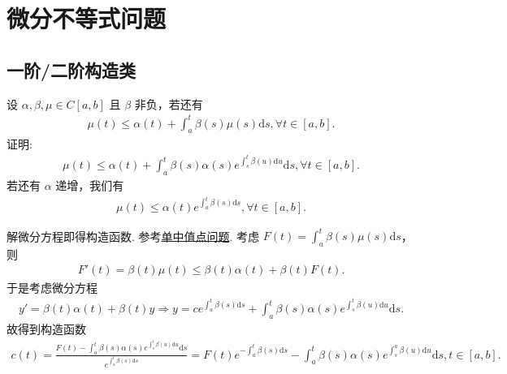 \documentclass[../../main.tex]{subfiles}%
\begin{document}
\section{微分不等式问题}

\subsection{一阶/二阶构造类}

\begin{proposition}[Gronwall不等式]\label{proposition:Gronwall不等式}
设 $\alpha,\beta,\mu\in C[a,b]$ 且 $\beta$ 非负，若还有
\begin{align}
\mu(t)\leqslant\alpha(t)+\int_{a}^{t}\beta(s)\mu(s)\mathrm{d}s,\forall t\in[a,b].
\label{equation---12.6}
\end{align}
证明:
\begin{align*}
\mu(t)\leqslant\alpha(t)+\int_{a}^{t}\beta(s)\alpha(s)e^{\int_{s}^{t}\beta(u)\mathrm{d}u}\mathrm{d}s,\forall t\in[a,b].
\end{align*}
若还有 $\alpha$ 递增，我们有
\begin{align*}
\mu(t)\leqslant\alpha(t)e^{\int_{a}^{t}\beta(s)\mathrm{d}s},\forall t\in[a,b].
\end{align*}
\end{proposition}
\begin{note}
解微分方程即得构造函数. 参考\hyperref[section单中值点问题]{单中值点问题}. 考虑 $F(t)=\int_{a}^{t}\beta(s)\mu(s)\mathrm{d}s$，则
\begin{align*}
F'(t)=\beta(t)\mu(t)\leqslant\beta(t)\alpha(t)+\beta(t)F(t).
\end{align*}
于是考虑微分方程
\begin{align*}
y'=\beta(t)\alpha(t)+\beta(t)y\Rightarrow y=ce^{\int_{a}^{t}\beta(s)\mathrm{d}s}+\int_{a}^{t}\beta(s)\alpha(s)e^{\int_{s}^{t}\beta(u)\mathrm{d}u}\mathrm{d}s.
\end{align*}
故得到构造函数
\begin{align*}
c(t)=\frac{F(t)-\int_{a}^{t}\beta(s)\alpha(s)e^{\int_{s}^{t}\beta(u)\mathrm{d}u}\mathrm{d}s}{e^{\int_{a}^{t}\beta(s)\mathrm{d}s}}=F(t)e^{-\int_{a}^{t}\beta(s)\mathrm{d}s}-\int_{a}^{t}\beta(s)\alpha(s)e^{\int_{s}^{a}\beta(u)\mathrm{d}u}\mathrm{d}s,t\in[a,b].
\end{align*} 
\end{note}
\end{document}
